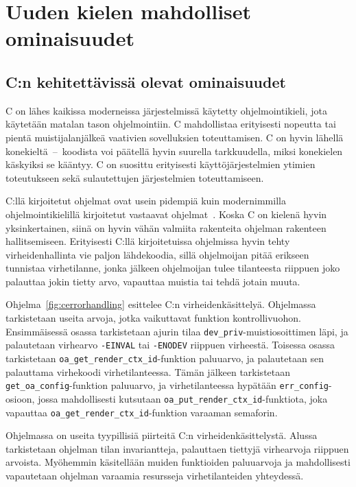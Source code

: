 \section{Uuden kielen mahdolliset ominaisuudet}

\subsection{C:n kehitettävissä olevat ominaisuudet}

C on lähes kaikissa moderneissa järjestelmissä käytetty ohjelmointikieli, jota
käytetään matalan tason ohjelmointiin. C mahdollistaa erityisesti nopeutta tai
pientä muistijalanjälkeä vaativien sovelluksien toteuttamisen. C on hyvin
lähellä konekieltä~--~koodista voi päätellä hyvin suurella tarkkuudella, miksi
konekielen käskyiksi se kääntyy. C on suosittu erityisesti käyttöjärjestelmien
ytimien toteutukseen sekä sulautettujen järjestelmien toteuttamiseen.

C:llä kirjoitetut ohjelmat ovat usein pidempiä kuin modernimmilla
ohjelmointikielillä kirjoitetut vastaavat ohjelmat~\citep{codelength,
qsmcodelength}. Koska C on kielenä hyvin yksinkertainen, siinä on hyvin vähän
valmiita rakenteita ohjelman rakenteen hallitsemiseen. Erityisesti C:llä
kirjoitetuissa ohjelmissa hyvin tehty virheidenhallinta vie paljon lähdekoodia,
sillä ohjelmoijan pitää erikseen tunnistaa virhetilanne, jonka jälkeen
ohjelmoijan tulee tilanteesta riippuen joko palauttaa jokin tietty arvo,
vapauttaa muistia tai tehdä jotain muuta.

Ohjelma~\ref{fig:cerrorhandling} esittelee C:n virheidenkäsittelyä. Ohjelmassa
tarkistetaan useita arvoja, jotka vaikuttavat funktion kontrollivuohon.
Ensimmäisessä osassa tarkistetaan ajurin tilaa
\texttt{dev\_priv}-muistiosoittimen läpi, ja palautetaan virhearvo
\texttt{-EINVAL} tai \texttt{-ENODEV} riippuen virheestä. Toisessa osassa
tarkistetaan \texttt{oa\_get\_render\_ctx\_id}-funktion paluuarvo, ja
palautetaan sen palauttama virhekoodi virhetilanteessa. Tämän jälkeen
tarkistetaan \texttt{get\_oa\_config}-funktion paluuarvo, ja virhetilanteessa
hypätään \texttt{err\_config}-osioon, jossa mahdollisesti kutsutaan
\texttt{oa\_put\_render\_ctx\_id}-funktiota, joka vapauttaa
\texttt{oa\_get\_render\_ctx\_id}-funktion varaaman semaforin.

Ohjelmassa on useita tyypillisiä piirteitä C:n virheidenkäsittelystä. Alussa
tarkistetaan ohjelman tilan invariantteja, palauttaen tiettyjä virhearvoja
riippuen arvoista. Myöhemmin käsitellään muiden funktioiden paluuarvoja ja
mahdollisesti vapautetaan ohjelman varaamia resursseja virhetilanteiden
yhteydessä.

